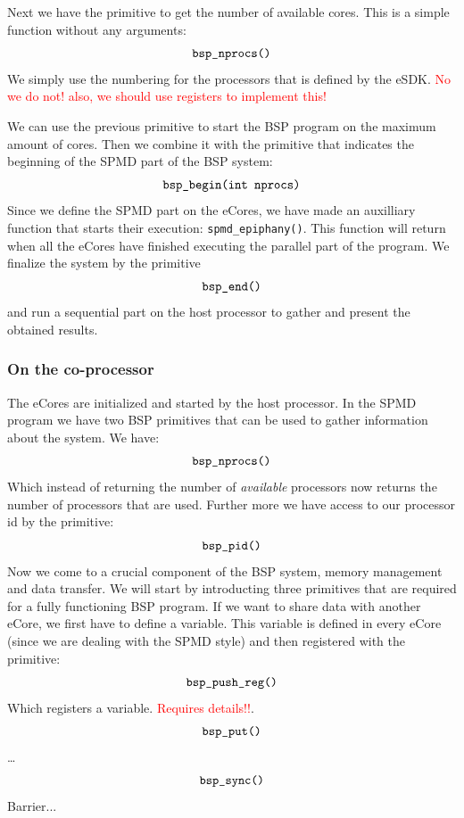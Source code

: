 \documentclass[fleqn]{article}
\renewcommand{\(}{\left(}
\renewcommand{\)}{\right)}
\newcommand{\todo}[1]{\textcolor{red}{#1}}
\begin{document}
Next we have the primitive to get the number of available cores.  This is a simple function without any arguments:
\begin{equation}
    \verb.bsp_nprocs(). 
\end{equation}
We simply use the numbering for the processors that is defined by the eSDK. \todo{No we do not! also, we should use registers to implement this!}

We can use the previous primitive to start the BSP program on the maximum amount of cores. Then we combine it with the primitive that indicates the beginning of the SPMD part of the BSP system:
\begin{equation}
    \verb.bsp_begin(int nprocs). 
\end{equation}
Since we define the SPMD part on the eCores, we have made an auxilliary function that starts their execution: \verb.spmd_epiphany().. This function will return when all the eCores have finished executing the parallel part of the program. We finalize the system by the primitive
\begin{equation}
    \verb.bsp_end(). 
\end{equation}
and run a sequential part on the host processor to gather and present the obtained results.

\subsubsection{On the co-processor}

The eCores are initialized and started by the host processor. In the SPMD program we have two BSP primitives that can be used to gather information about the system. We have:
\begin{equation}
    \verb.bsp_nprocs(). 
\end{equation}
Which instead of returning the number of \emph{available} processors now returns the number of processors that are used. Further more we have access to our processor id by the primitive:
\begin{equation}
    \verb.bsp_pid(). 
\end{equation}
Now we come to a crucial component of the BSP system, memory management and data transfer. We will start by introducting three primitives that are required for a fully functioning BSP program. If we want to share data with another eCore, we first have to define a variable. This variable is defined in every eCore (since we are dealing with the SPMD style) and then registered with the primitive:
\begin{equation}
    \verb.bsp_push_reg(). 
\end{equation}
Which registers a variable. \todo{Requires details!!}.
\begin{equation}
    \verb.bsp_put(). 
\end{equation}
\ldots
\begin{equation}
    \verb.bsp_sync(). 
\end{equation}
Barrier...
\end{document}
